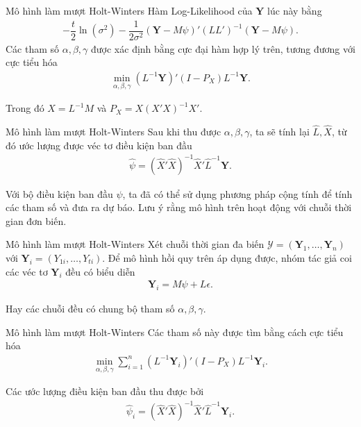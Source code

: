 \begin{frame}{Mô hình làm mượt Holt-Winters}
    Hàm Log-Likelihood của $\textbf{Y}$ lúc này bằng
    \begin{align}
        -\dfrac{t}{2}\ln\left(\sigma^2\right) - \dfrac{1}{2\sigma^2} \left(\textbf{Y} - M \psi\right)'\left(LL'\right)^{-1}\left(\textbf{Y} - M \psi\right).
    \end{align}
    Các tham số $\alpha, \beta, \gamma$ được xác định bằng cực đại hàm hợp lý trên, tương đương với cực tiểu hóa
    \begin{align}
        \min_{\alpha, \beta, \gamma} \left(L^{-1} \textbf{Y}\right)' \left(I - P_X\right) L^{-1} \textbf{Y}.
    \end{align}
    
    Trong đó $X = L^{-1}M$ và $P_X = X \left(X'X\right)^{-1}X'$.
\end{frame}

\begin{frame}{Mô hình làm mượt Holt-Winters}
    Sau khi thu được $\alpha, \beta, \gamma$, ta sẽ tính lại $\hat{L}, \hat{X}$, từ đó ước lượng được véc tơ điều kiện ban đầu
    \begin{align}
        \hat{\psi} = \left(\hat{X}'\hat{X}\right)^{-1} \hat{X}'\hat{L}^{-1} \textbf{Y}.
    \end{align}
    
    Với bộ điều kiện ban đầu $\psi$, ta đã có thể sử dụng phương pháp cộng tính để tính các tham số và đưa ra dự báo. Lưu ý rằng mô hình trên hoạt động với chuỗi thời gian đơn biến.
\end{frame}

\begin{frame}{Mô hình làm mượt Holt-Winters}
    Xét chuỗi thời gian đa biến $\mathcal{Y} = \left(\textbf{Y}_1, \dots, \textbf{Y}_n\right) $ với $\textbf{Y}_i = \left(Y_{1i}, \dots, Y_{ti}\right)$. Để mô hình hồi quy trên áp dụng được, nhóm tác giả coi các véc tơ $\textbf{Y}_i$ đều có biểu diễn
    \begin{align}
        \textbf{Y}_i = M \psi + L \epsilon.  
    \end{align}
    
    Hay các chuỗi đều có chung bộ tham số $\alpha, \beta, \gamma$.
\end{frame}

\begin{frame}{Mô hình làm mượt Holt-Winters}
    Các tham số này được tìm bằng cách cực tiểu hóa
    \begin{align}
        \min_{\alpha, \beta, \gamma} \sum_{i=1}^n \left(L^{-1} \textbf{Y}_i\right)' \left(I - P_X\right) L^{-1} \textbf{Y}_i.        
    \end{align}
    
    Các ước lượng điều kiện ban đầu thu được bởi
    \begin{align}
        \hat{\psi}_i = \left(\hat{X}'\hat{X}\right)^{-1} \hat{X}'\hat{L}^{-1} \textbf{Y}_i.        
    \end{align}
\end{frame}

